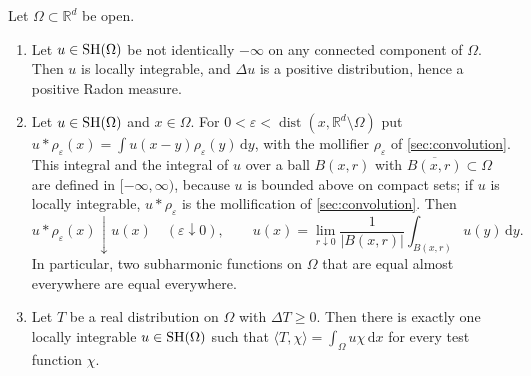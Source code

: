 \begin{theorem}\label{thm:subharmonic-distribution}
Let $\Omega\subset\mathbb R^d$ be open.
\begin{enumerate}
\item Let $u\in\mathrm{SH}(\Omega)$ be not identically $-\infty$ on any connected component of $\Omega$. Then $u$ is locally integrable, and $\Delta u$ is a positive distribution, hence a positive Radon measure.
\item Let $u\in\mathrm{SH}(\Omega)$ and $x\in\Omega$. For $0<\varepsilon<\operatorname{dist}(x,\mathbb R^d\setminus\Omega)$ put $u*\rho_\varepsilon(x)=\int u(x-y)\rho_\varepsilon(y)\,\mathrm dy$, with the mollifier $\rho_\varepsilon$ of \cref{sec:convolution}. This integral and the integral of $u$ over a ball $B(x,r)$ with $\overline{B(x,r)}\subset\Omega$ are defined in $[-\infty,\infty)$, because $u$ is bounded above on compact sets; if $u$ is locally integrable, $u*\rho_\varepsilon$ is the mollification of \cref{sec:convolution}. Then
\begin{equation}\label{eq:canonical-subharmonic}
 u*\rho_\varepsilon(x)\downarrow u(x)\quad(\varepsilon\downarrow0),\qquad
 u(x)=\lim_{r\downarrow0}\frac{1}{|B(x,r)|}\int_{B(x,r)}u(y)\,\mathrm d y.
\end{equation}
In particular, two subharmonic functions on $\Omega$ that are equal almost everywhere are equal everywhere.
\item Let $T$ be a real distribution on $\Omega$ with $\Delta T\geq0$. Then there is exactly one locally integrable $u\in\mathrm{SH}(\Omega)$ such that $\langle T,\chi\rangle=\int_\Omega u\chi\,\mathrm d x$ for every test function $\chi$.
\end{enumerate}
\end{theorem}
